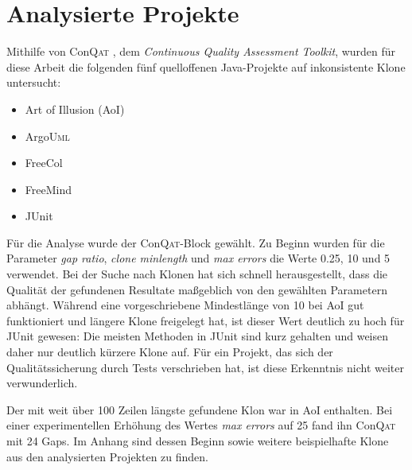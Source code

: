 \section{Analysierte Projekte}

Mithilfe von Con\textsc{Qat} \cite{deissenboeck2008tool}, dem \textit{Continuous Quality Assessment Toolkit}, wurden für diese Arbeit die folgenden fünf quelloffenen Java-Projekte auf inkonsistente Klone untersucht:

\begin{itemize}
  \item Art of Illusion (AoI)
  \item Argo\textsc{Uml}
  \item FreeCol
  \item FreeMind
  \item JUnit
\end{itemize}

Für die Analyse wurde der Con\textsc{Qat}-Block  gewählt. Zu Beginn wurden für die Parameter \textit{gap ratio}, \textit{clone minlength} und \textit{max errors} die Werte 0.25, 10 und 5 verwendet. Bei der Suche nach Klonen hat sich schnell herausgestellt, dass die Qualität der gefundenen Resultate maßgeblich von den gewählten Parametern abhängt. Während eine vorgeschriebene Mindestlänge von 10 bei AoI gut funktioniert und längere Klone freigelegt hat, ist dieser Wert deutlich zu hoch für JUnit gewesen: Die meisten Methoden in JUnit sind kurz gehalten und weisen daher nur deutlich kürzere Klone auf. Für ein Projekt, das sich der Qualitätssicherung durch Tests verschrieben hat, ist diese Erkenntnis nicht weiter verwunderlich.

Der mit weit über 100 Zeilen längste gefundene Klon war in AoI enthalten. Bei einer experimentellen Erhöhung des Wertes \textit{max errors} auf 25 fand ihn Con\textsc{Qat} mit 24 Gaps. Im Anhang sind dessen Beginn sowie weitere beispielhafte Klone aus den analysierten Projekten zu finden.
